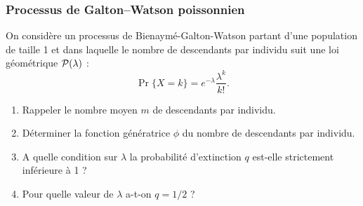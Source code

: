 \subsubsection{Processus de Galton–Watson poissonnien} %
  On considère un processus de Bienaymé-Galton-Watson partant d'une population de taille 1 et dans laquelle le nombre de descendants par individu suit une loi géométrique $\mathcal{P}(\lambda)$ :
  $$
  \Pr\{X = k\} = e^{-\lambda} \frac{\lambda^k}{k!}.
  $$
  \begin{enumerate}
    \item Rappeler le nombre moyen $m$ de descendants par individu.
    \item Déterminer la fonction génératrice $\phi$ du nombre de descendants par individu.
    \item A quelle condition sur $\lambda$ la probabilité d'extinction $q$ est-elle strictement inférieure à 1 ?
    \item Pour quelle valeur de $\lambda$ a-t-on $q = 1/2$ ?
  \end{enumerate}
